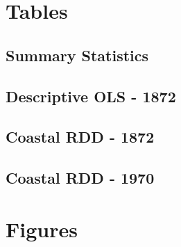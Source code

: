 \documentclass{article}
\begin{document}
\clearpage

\section*{Tables}

\subsection{Summary Statistics}





\clearpage

\subsection{Descriptive OLS - 1872}



\clearpage



\clearpage

\subsection{Coastal RDD - 1872}

\clearpage

\subsection{Coastal RDD - 1970}


\clearpage

\appendix

\setcounter{figure}{0}  
\setcounter{table}{0}  

\renewcommand{\thefigure}{A.\arabic{figure}}
\renewcommand{\thetable}{A.\arabic{table}}

\section{Figures}
\end{document}

